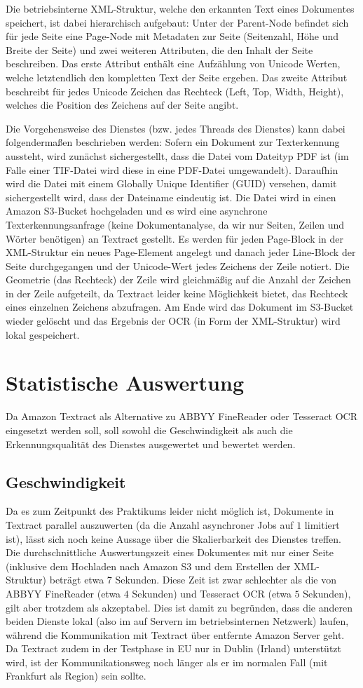 \documentclass{whswinvcbook}
\begin{document}
Die betriebsinterne XML-Struktur, welche den erkannten Text eines Dokumentes speichert, ist dabei hierarchisch aufgebaut: Unter der Parent-Node befindet sich für jede Seite eine Page-Node mit Metadaten zur Seite (Seitenzahl, Höhe und Breite der Seite) und zwei weiteren Attributen, die den Inhalt der Seite beschreiben. Das erste Attribut enthält eine Aufzählung von Unicode Werten, welche letztendlich den kompletten Text der Seite ergeben. Das zweite Attribut beschreibt für jedes Unicode Zeichen das Rechteck (Left, Top, Width, Height), welches die Position des Zeichens auf der Seite angibt.

Die Vorgehensweise des Dienstes (bzw. jedes Threads des Dienstes) kann dabei folgendermaßen beschrieben werden: Sofern ein Dokument zur Texterkennung aussteht, wird zunächst sichergestellt, dass die Datei vom Dateityp PDF ist (im Falle einer TIF-Datei wird diese in eine PDF-Datei umgewandelt). Daraufhin wird die Datei mit einem Globally Unique Identifier (GUID) versehen, damit sichergestellt wird, dass der Dateiname eindeutig ist. Die Datei wird in einen Amazon S3-Bucket hochgeladen und es wird eine asynchrone Texterkennungsanfrage (keine Dokumentanalyse, da wir nur Seiten, Zeilen und Wörter benötigen) an Textract gestellt. Es werden für jeden Page-Block in der XML-Struktur ein neues Page-Element angelegt und danach jeder Line-Block der Seite durchgegangen und der Unicode-Wert jedes Zeichens der Zeile notiert. Die Geometrie (das Rechteck) der Zeile wird gleichmäßig auf die Anzahl der Zeichen in der Zeile aufgeteilt, da Textract leider keine Möglichkeit bietet, das Rechteck eines einzelnen Zeichens abzufragen. Am Ende wird das Dokument im S3-Bucket wieder gelöscht und das Ergebnis der OCR (in Form der XML-Struktur) wird lokal gespeichert.
\chapter{Statistische Auswertung}
Da Amazon Textract als Alternative zu ABBYY FineReader oder Tesseract OCR eingesetzt werden soll, soll sowohl die Geschwindigkeit als auch die Erkennungsqualität des Dienstes ausgewertet und bewertet werden.
\section{Geschwindigkeit}
Da es zum Zeitpunkt des Praktikums leider nicht möglich ist, Dokumente in Textract parallel auszuwerten (da die Anzahl asynchroner Jobs auf $1$ limitiert ist), lässt sich noch keine Aussage über die Skalierbarkeit des Dienstes treffen. Die durchschnittliche Auswertungszeit eines Dokumentes mit nur einer Seite (inklusive dem Hochladen nach Amazon S3 und dem Erstellen der XML-Struktur) beträgt etwa $7$ Sekunden. Diese Zeit ist zwar schlechter als die von ABBYY FineReader (etwa $4$ Sekunden) und Tesseract OCR (etwa $5$ Sekunden), gilt aber trotzdem als akzeptabel. Dies ist damit zu begründen, dass die anderen beiden Dienste lokal (also im auf Servern im betriebsinternen Netzwerk) laufen, während die Kommunikation mit Textract über entfernte Amazon Server geht. Da Textract zudem in der Testphase in EU nur in Dublin (Irland) unterstützt wird, ist der Kommunikationsweg noch länger als er im normalen Fall (mit Frankfurt als Region) sein sollte.
\end{document}
